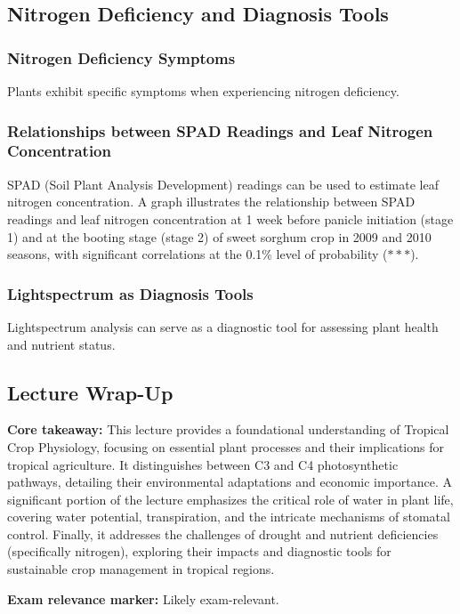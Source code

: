 \subsection{Nitrogen Deficiency and Diagnosis Tools} 
\subsubsection{Nitrogen Deficiency Symptoms} 
Plants exhibit specific symptoms when experiencing nitrogen deficiency.

\subsubsection{Relationships between SPAD Readings and Leaf Nitrogen Concentration} 
SPAD (Soil Plant Analysis Development) readings can be used to estimate leaf nitrogen concentration. A graph illustrates the relationship between SPAD readings and leaf nitrogen concentration at 1 week before panicle initiation (stage 1) and at the booting stage (stage 2) of sweet sorghum crop in 2009 and 2010 seasons, with significant correlations at the 0.1\% level of probability ($***$).

\subsubsection{Lightspectrum as Diagnosis Tools} 
Lightspectrum analysis can serve as a diagnostic tool for assessing plant health and nutrient status.

\subsection*{Lecture Wrap-Up} 
\textbf{Core takeaway:} This lecture provides a foundational understanding of Tropical Crop Physiology, focusing on essential plant processes and their implications for tropical agriculture. It distinguishes between C3 and C4 photosynthetic pathways, detailing their environmental adaptations and economic importance. A significant portion of the lecture emphasizes the critical role of water in plant life, covering water potential, transpiration, and the intricate mechanisms of stomatal control. Finally, it addresses the challenges of drought and nutrient deficiencies (specifically nitrogen), exploring their impacts and diagnostic tools for sustainable crop management in tropical regions. 

\vspace{1em} 
\textbf{Exam relevance marker:} Likely exam-relevant.
